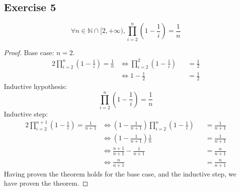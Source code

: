 \subsection{Exercise 5}
\begin{theorem}
	\begin{equation*}
		\forall n \in \mathbb{N}\cap[2,+\infty),\prod_{i=2}^{n}{\left(1-\frac{1}{i}\right)}=\frac{1}{n}
	\end{equation*}
\end{theorem}
\begin{proof}
	Base case: $n=2$.
	\begin{alignat*}{2}
		\prod_{i=2}^{n}{\left(1-\frac{1}{i}\right)}=\frac{1}{n}
		&\iff \prod_{i=2}^{2}{\left(1-\frac{1}{i}\right)}&&=\frac{1}{2} \\
		&\iff 1-\frac{1}{2}                              &&=\frac{1}{2}
	\end{alignat*}
	Inductive hypothesis:
	\begin{equation*}
		\prod_{i=2}^{n}{\left(1-\frac{1}{i}\right)}=\frac{1}{n}
	\end{equation*}
	Inductive step:
	\begin{alignat*}{2}
		\prod_{i=2}^{n+1}{\left(1-\frac{1}{i}\right)}=\frac{1}{n+1}
		&\iff \left(1-\frac{1}{n+1}\right)\prod_{i=2}^{n}{\left(1-\frac{1}{i}\right)}&&=\frac{1}{n+1} \\
		&\iff \left(1-\frac{1}{n+1}\right)\frac{1}{n}                                &&=\frac{1}{n+1} \\
		&\iff \frac{n+1}{n+1}-\frac{1}{n+1}                                          &&=\frac{n}{n+1} \\
		&\iff \frac{n}{n+1}                                                          &&=\frac{n}{n+1}
	\end{alignat*}
	Having proven the theorem holds for the base case, and the inductive step, we have proven the theorem.
\end{proof}
\pagebreak

